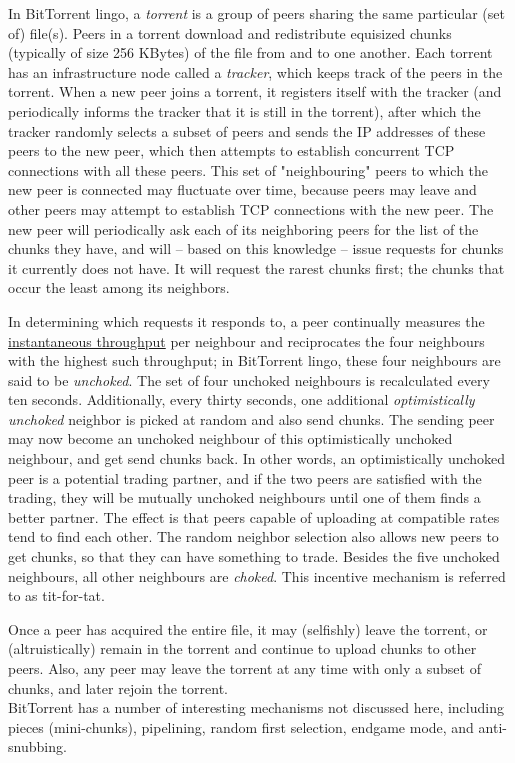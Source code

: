 \documentclass[8pt, table, xcdraw]{article}%
\begin{document}
In BitTorrent lingo, a \emph{torrent} is a group of peers sharing the same particular (set of) file(s). Peers in a torrent download and redistribute equisized chunks (typically of size 256 KBytes) of the file from and to one another. Each torrent has an infrastructure node called a \emph{tracker}, which keeps track of the peers in the torrent. When a new peer joins a torrent, it registers itself with the tracker (and periodically informs the tracker that it is still in the torrent), after which the tracker randomly selects a subset of peers and sends the IP addresses of these peers to the new peer, which then attempts to establish concurrent TCP connections with all these peers. This set of "neighbouring" peers to which the new peer is connected may fluctuate over time, because peers may leave and other peers may attempt to establish TCP connections with the new peer. The new peer will periodically ask each of its neighboring peers for the list of the chunks they have, and will -- based on this knowledge -- issue requests for chunks it currently does not have. It will request the rarest chunks first; the chunks that occur the least among its neighbors.

In determining which requests it responds to, a peer continually measures the \hyperref[throughput]{instantaneous throughput} per neighbour and reciprocates the four neighbours with the highest such throughput; in BitTorrent lingo, these four neighbours are said to be \emph{unchoked}. The set of four unchoked neighbours is recalculated every ten seconds. Additionally, every thirty seconds, one additional \emph{optimistically unchoked} neighbor is picked at random and also send chunks. The sending peer may now become an unchoked neighbour of this optimistically unchoked neighbour, and get send chunks back. In other words, an optimistically unchoked peer is a potential trading partner, and if the two peers are satisfied with the trading, they will be mutually unchoked neighbours until one of them finds a better partner. The effect is that peers capable of uploading at compatible rates tend to find each other. The random neighbor selection also allows new peers to get chunks, so that they can have something to trade. Besides the five unchoked neighbours, all other neighbours are \emph{choked}. This incentive mechanism is referred to as tit-for-tat.

Once a peer has acquired the entire file, it may (selfishly) leave the torrent, or (altruistically) remain in the torrent and continue to upload chunks to other peers. Also, any peer may leave the torrent at any time with only a subset of chunks, and later rejoin the torrent.\\
BitTorrent has a number of interesting mechanisms not discussed here, including pieces (mini-chunks), pipelining, random first selection, endgame mode, and anti-snubbing.
\end{document}
